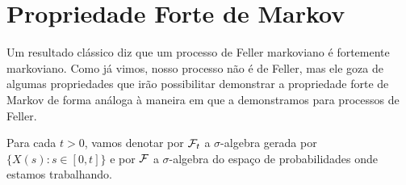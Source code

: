
\section{Propriedade Forte de Markov}
\label{sec:prop-forte-markov}

Um resultado clássico diz que um processo de Feller markoviano é
fortemente markoviano. Como já vimos, nosso processo não é de Feller,
mas ele goza de algumas propriedades que irão possibilitar demonstrar
a propriedade forte de Markov de forma análoga à maneira em que  a
demonstramos para processos de Feller.

Para cada $t > 0$, vamos denotar por ${\mathcal{F}}_t$ a $\sigma$-algebra gerada
por $\{X(s): s \in [0, t]\}$ e por ${\mathcal{F}}$ a $\sigma$-algebra do espaço
de probabilidades onde estamos trabalhando.

